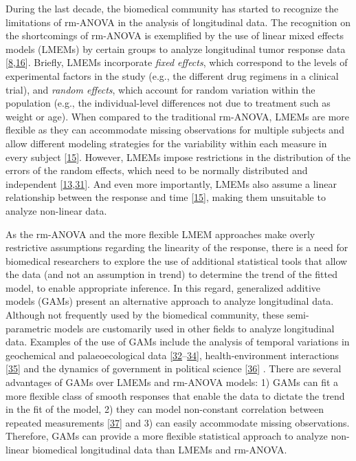 \documentclass[
]{article}
\begin{document}
During the last decade, the biomedical community has started to recognize the limitations of rm-ANOVA in the analysis of longitudinal data. The recognition on the shortcomings of rm-ANOVA is exemplified by the use of linear mixed effects models (LMEMs) by certain groups to analyze longitudinal tumor response data {[}\protect\hyperlink{ref-skala2010}{8},\protect\hyperlink{ref-vishwanath2009}{16}{]}. Briefly, LMEMs incorporate \emph{fixed effects}, which correspond to the levels of experimental factors in the study (e.g., the different drug regimens in a clinical trial), and \emph{random effects}, which account for random variation within the population (e.g., the individual-level differences not due to treatment such as weight or age). When compared to the traditional rm-ANOVA, LMEMs are more flexible as they can accommodate missing observations for multiple subjects and allow different modeling strategies for the variability within each measure in every subject {[}\protect\hyperlink{ref-pinheiro2006}{15}{]}. However, LMEMs impose restrictions in the distribution of the errors of the random effects, which need to be normally distributed and independent {[}\protect\hyperlink{ref-gueorguieva2004}{13},\protect\hyperlink{ref-barr2013}{31}{]}. And even more importantly, LMEMs also assume a linear relationship between the response and time {[}\protect\hyperlink{ref-pinheiro2006}{15}{]}, making them unsuitable to analyze non-linear data.

As the rm-ANOVA and the more flexible LMEM approaches make overly restrictive assumptions regarding the linearity of the response, there is a need for biomedical researchers to explore the use of additional statistical tools that allow the data (and not an assumption in trend) to determine the trend of the fitted model, to enable appropriate inference. In this regard, generalized additive models (GAMs) present an alternative approach to analyze longitudinal data. Although not frequently used by the biomedical community, these semi-parametric models are customarily used in other fields to analyze longitudinal data. Examples of the use of GAMs include the analysis of temporal variations in geochemical and palaeoecological data {[}\protect\hyperlink{ref-rose2012}{32}--\protect\hyperlink{ref-simpson2018}{34}{]}, health-environment interactions {[}\protect\hyperlink{ref-yang2012}{35}{]} and the dynamics of government in political science {[}\protect\hyperlink{ref-beck1998}{36}{]} . There are several advantages of GAMs over LMEMs and rm-ANOVA models: 1) GAMs can fit a more flexible class of smooth responses that enable the data to dictate the trend in the fit of the model, 2) they can model non-constant correlation between repeated measurements {[}\protect\hyperlink{ref-wood2017}{37}{]} and 3) can easily accommodate missing observations. Therefore, GAMs can provide a more flexible statistical approach to analyze non-linear biomedical longitudinal data than LMEMs and rm-ANOVA.
\end{document}
